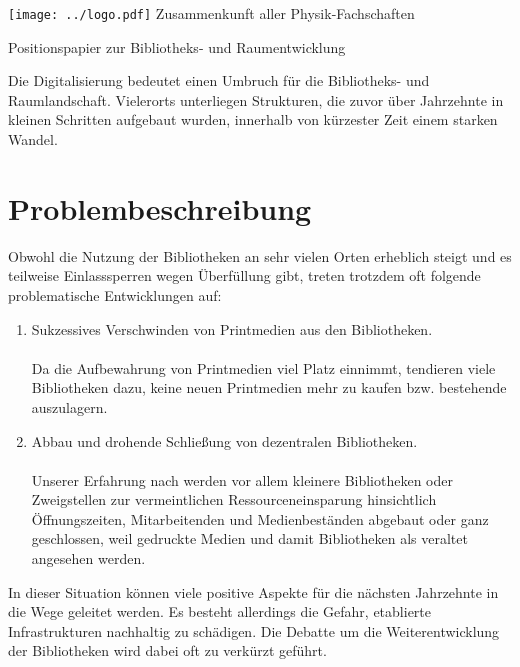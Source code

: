 \documentclass[DIV=calc]{scrartcl}
\begin{document}
  \hspace{0.87\textwidth}
  \begin{minipage}{120pt}
  	\vspace{-1.8cm}
  	\texttt{[image: ../logo.pdf]}
  	\centering
  	\small Zusammenkunft aller Physik-Fachschaften
  \end{minipage}
  \begin{center}
    \huge{Positionspapier zur Bibliotheks- und Raumentwicklung}\vspace{.25\baselineskip}\\
  	\normalsize
  \end{center}
  \vspace{1cm}


Die Digitalisierung bedeutet einen Umbruch für die Bibliotheks- und Raumlandschaft.
Vielerorts unterliegen Strukturen, die zuvor über Jahrzehnte in kleinen Schritten aufgebaut wurden, innerhalb von kürzester Zeit einem starken Wandel.

\section{Problembeschreibung}

Obwohl die Nutzung der Bibliotheken an sehr vielen Orten erheblich steigt und es teilweise Einlasssperren wegen Überfüllung gibt, treten trotzdem oft folgende problematische Entwicklungen auf:

\begin{enumerate}
\item Sukzessives Verschwinden von Printmedien aus den Bibliotheken.\\
\\Da die Aufbewahrung von Printmedien viel Platz einnimmt, tendieren viele Bibliotheken dazu, keine neuen Printmedien mehr zu kaufen bzw. bestehende auszulagern.
\item Abbau und drohende Schließung von dezentralen Bibliotheken. \\
%
\\ Unserer Erfahrung nach werden vor allem kleinere Bibliotheken oder Zweigstellen zur vermeintlichen Ressourceneinsparung hinsichtlich Öffnungszeiten, Mitarbeitenden und Medienbeständen abgebaut oder ganz geschlossen, weil gedruckte Medien und damit Bibliotheken als veraltet angesehen werden.

\end{enumerate}
In dieser Situation können viele positive Aspekte für die nächsten Jahrzehnte in die Wege geleitet werden. Es besteht allerdings die Gefahr, etablierte Infrastrukturen nachhaltig zu schädigen. Die Debatte um die Weiterentwicklung der Bibliotheken wird dabei oft zu verkürzt geführt.\\ \\
\end{document}
